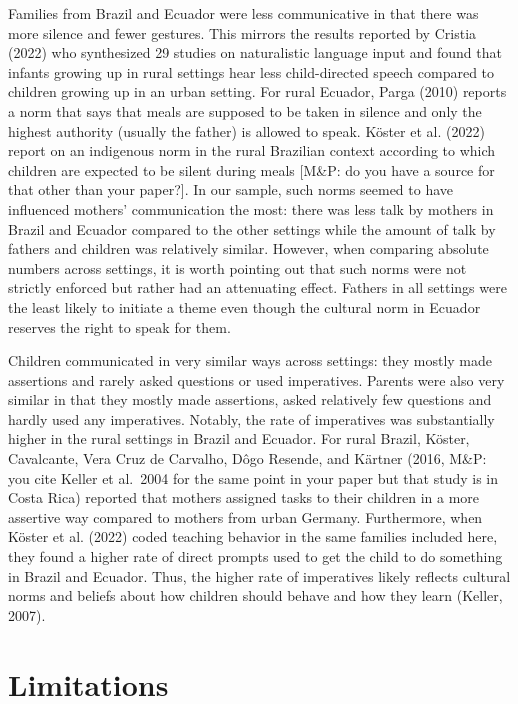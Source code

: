 \documentclass[
  man,floatsintext]{apa6}
\begin{document}
Families from Brazil and Ecuador were less communicative in that there was more silence and fewer gestures. This mirrors the results reported by Cristia (2022) who synthesized 29 studies on naturalistic language input and found that infants growing up in rural settings hear less child-directed speech compared to children growing up in an urban setting. For rural Ecuador, Parga (2010) reports a norm that says that meals are supposed to be taken in silence and only the highest authority (usually the father) is allowed to speak. Köster et al. (2022) report on an indigenous norm in the rural Brazilian context according to which children are expected to be silent during meals {[}M\&P: do you have a source for that other than your paper?{]}. In our sample, such norms seemed to have influenced mothers' communication the most: there was less talk by mothers in Brazil and Ecuador compared to the other settings while the amount of talk by fathers and children was relatively similar. However, when comparing absolute numbers across settings, it is worth pointing out that such norms were not strictly enforced but rather had an attenuating effect. Fathers in all settings were the least likely to initiate a theme even though the cultural norm in Ecuador reserves the right to speak for them.

Children communicated in very similar ways across settings: they mostly made assertions and rarely asked questions or used imperatives. Parents were also very similar in that they mostly made assertions, asked relatively few questions and hardly used any imperatives. Notably, the rate of imperatives was substantially higher in the rural settings in Brazil and Ecuador. For rural Brazil, Köster, Cavalcante, Vera Cruz de Carvalho, Dôgo Resende, and Kärtner (2016, M\&P: you cite Keller et al.~2004 for the same point in your paper but that study is in Costa Rica) reported that mothers assigned tasks to their children in a more assertive way compared to mothers from urban Germany. Furthermore, when Köster et al. (2022) coded teaching behavior in the same families included here, they found a higher rate of direct prompts used to get the child to do something in Brazil and Ecuador. Thus, the higher rate of imperatives likely reflects cultural norms and beliefs about how children should behave and how they learn (Keller, 2007).

\hypertarget{limitations}{%
\section{Limitations}\label{limitations}}
\end{document}
